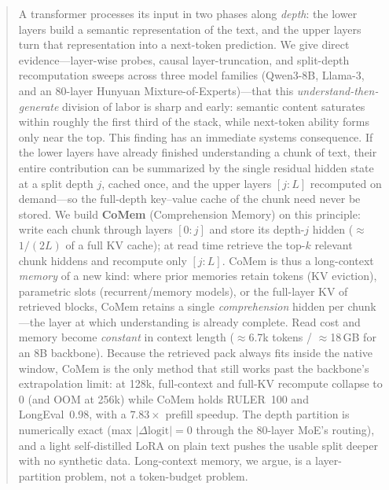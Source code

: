\begin{abstract}
A transformer processes its input in two phases along \emph{depth}: the lower
layers build a semantic representation of the text, and the upper layers turn
that representation into a next-token prediction. We give direct
evidence---layer-wise probes, causal layer-truncation, and split-depth
recomputation sweeps across three model families (Qwen3-8B, Llama-3, and an
80-layer Hunyuan Mixture-of-Experts)---that this \emph{understand-then-generate}
division of labor is sharp and early: semantic content saturates within roughly
the first third of the stack, while next-token ability forms only near the top.
This finding has an immediate systems consequence. If the lower layers have
already finished understanding a chunk of text, their entire contribution can be
summarized by the single residual hidden state at a split depth $j$, cached
once, and the upper layers $[j{:}L]$ recomputed on demand---so the full-depth
key--value cache of the chunk need never be stored. We build \textbf{CoMem}
(Comprehension Memory) on this principle: write each chunk through layers
$[0{:}j]$ and store its depth-$j$ hidden ($\approx$$1/(2L)$ of a full KV cache);
at read time retrieve the top-$k$ relevant chunk hiddens and recompute only
$[j{:}L]$. CoMem is thus a long-context \emph{memory} of a new kind: where prior
memories retain tokens (KV eviction), parametric slots (recurrent/memory
models), or the full-layer KV of retrieved blocks, CoMem retains a single
\emph{comprehension} hidden per chunk---the layer at which understanding is
already complete. Read cost and memory become \emph{constant} in context length
($\approx$6.7k tokens / $\approx$18\,GB for an 8B backbone). Because the
retrieved pack always fits inside the native window, CoMem is the only method
that still works past the backbone's extrapolation limit: at 128k, full-context
and full-KV recompute collapse to 0 (and OOM at 256k) while CoMem holds
RULER~100 and LongEval~0.98, with a $7.83\times$ prefill speedup. The depth
partition is numerically exact (max $|\Delta\text{logit}|{=}0$ through the
80-layer MoE's routing), and a light self-distilled LoRA on plain text pushes
the usable split deeper with no synthetic data. Long-context memory, we argue,
is a layer-partition problem, not a token-budget problem.
\end{abstract}
